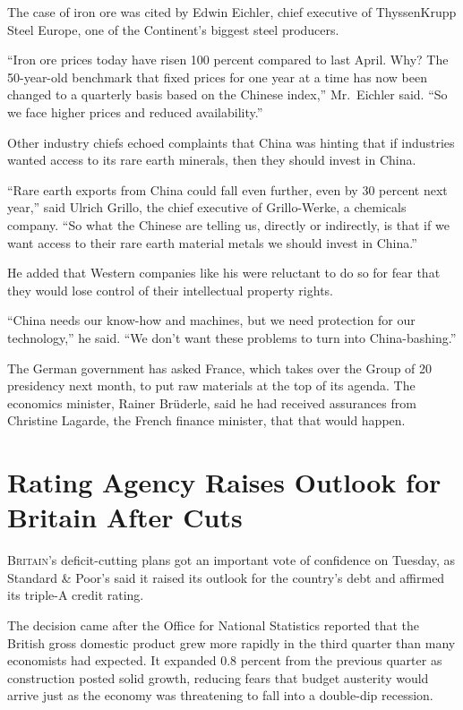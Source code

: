 ﻿\documentclass[12pt]{article}
\begin{document}
The case of iron ore was cited by Edwin Eichler, chief executive of ThyssenKrupp Steel Europe, one
of the Continent's biggest steel producers.

``Iron ore prices today have risen 100 percent compared to last April. Why? The 50-year-old
benchmark that fixed prices for one year at a time has now been changed to a quarterly basis based
on the Chinese index,'' Mr.~Eichler said. ``So we face higher prices and reduced availability.''

Other industry chiefs echoed complaints that China was hinting that if industries wanted access to
its rare earth minerals, then they should invest in China.

``Rare earth exports from China could fall even further, even by 30 percent next year,'' said Ulrich
Grillo, the chief executive of Grillo-Werke, a chemicals company. ``So what the Chinese are telling
us, directly or indirectly, is that if we want access to their rare earth material metals we should
invest in China.''

He added that Western companies like his were reluctant to do so for fear that they would lose
control of their intellectual property rights.

``China needs our know-how and machines, but we need protection for our technology,'' he said. ``We
don't want these problems to turn into China-bashing.''

The German government has asked France, which takes over the Group of 20 presidency next month, to
put raw materials at the top of its agenda. The economics minister, Rainer Brüderle, said he had
received assurances from Christine Lagarde, the French finance minister, that that would happen.

\section{Rating Agency Raises Outlook for Britain After Cuts}

\lettrine{B}{ritain}'s deficit-cutting plans got an important vote of
confidence on Tuesday, as Standard \& Poor's said it raised its outlook for the country's debt and
affirmed its triple-A credit rating.

The decision came after the Office for National Statistics reported that the British gross domestic
product grew more rapidly in the third quarter than many economists had expected. It expanded 0.8
percent from the previous quarter as construction posted solid growth, reducing fears that budget
austerity would arrive just as the economy was threatening to fall into a double-dip recession.
\end{document}
